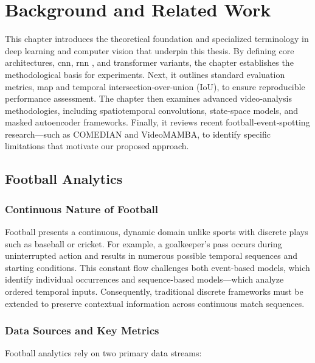 \chapter{Background and Related Work}
\label{chap:background}

This chapter introduces the theoretical foundation and specialized terminology in deep learning and computer vision that underpin this thesis. By defining core architectures, \acrlong{cnn}, \acrlong{rnn} , and transformer variants, the chapter establishes the methodological basis for experiments. Next, it outlines standard evaluation metrics, \acrfull{map} and temporal intersection‑over‑union (IoU), to ensure reproducible performance assessment. The chapter then examines advanced video‑analysis methodologies, including spatiotemporal convolutions, state‑space models, and masked autoencoder frameworks. Finally, it reviews recent football‑event‑spotting research—such as COMEDIAN and VideoMAMBA, to identify specific limitations that motivate our proposed approach.

\section{Football Analytics}
\label{sec:football_analytics}

\subsection{Continuous Nature of Football}
Football presents a continuous, dynamic domain unlike sports with discrete plays such as baseball or cricket. For example, a goalkeeper’s pass occurs during uninterrupted action and results in numerous possible temporal sequences and starting conditions. This constant flow challenges both event-based models, which identify individual occurrences and sequence-based models—which analyze ordered temporal inputs. Consequently, traditional discrete frameworks must be extended to preserve contextual information across continuous match sequences. 

\subsection{Data Sources and Key Metrics}
Football analytics rely on two primary data streams:

